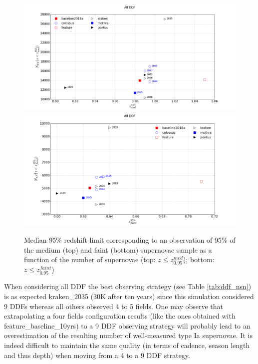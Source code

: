\documentclass[a4paper,10pt]{article}
\newcommand{\feature}{feature\_baseline\_10yrs}
\begin{document}
\begin{figure}[htbp]
  \begin{center}
    \includegraphics[width=\linewidth]{Z95_NSN_med.png}
    \includegraphics[width=\linewidth]{Z95_NSN.png}
    \caption{Median 95\% redshift limit corresponding to an observation of 95\% of the medium (top) and faint (bottom) supernovae sample as a function of the number of supernovae (top: $z\leq z_{0.95}^{med}$); bottom: $z\leq z_{0.95}^{faint}$)}
    \label{fig:z95}
  \end{center}
\end{figure}

When considering all DDF the best observing strategy (see Table \ref{tab:ddf_nsn}) is as expected kraken\_2035 (30K after ten years) since this simulation considered 9 DDFs whereas all others observed 4 to 5 fields. One may observe that extrapolating a four fields configuration results (like the ones obtained with \feature) to a 9 DDF observing strategy will probably lead to an overestimation of the resulting number of well-measured type Ia supernovae. It is indeed difficult to maintain the same quality (in terms of cadence, season length and thus depth) when moving from a 4 to a 9 DDF strategy.
\end{document}
